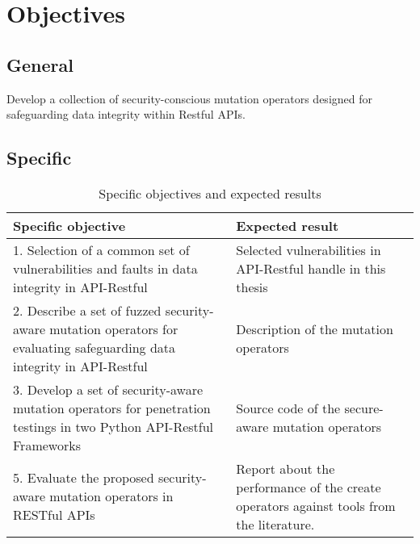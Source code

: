 \section{Objectives}

\subsection{General}

Develop a collection of security-conscious mutation operators designed for safeguarding data integrity within Restful APIs.
\subsection{Specific}

\begin{table}[H]
    \centering
    \begin{tabular}{|p{}|p{}|}
        \hline
         \textbf{Specific objective} & \textbf{Expected result} \\ \hline
         1.  Selection of a common set of vulnerabilities and faults in data integrity in API-Restful &   Selected vulnerabilities in API-Restful handle in this thesis  \\  \hline
         2. Describe a set of fuzzed security-aware mutation operators for evaluating safeguarding data integrity in API-Restful & Description of the mutation operators \\  \hline
         3. Develop a set of security-aware mutation operators for penetration testings in two Python API-Restful Frameworks & Source code of the secure-aware mutation operators \\  \hline
         5. Evaluate the proposed security-aware mutation operators in RESTful APIs & Report about the performance of the create operators against tools from the literature.
         \\ \hline
    \end{tabular}
    \caption{Specific objectives and expected results}
    \label{tab:objetivos}
\end{table}
